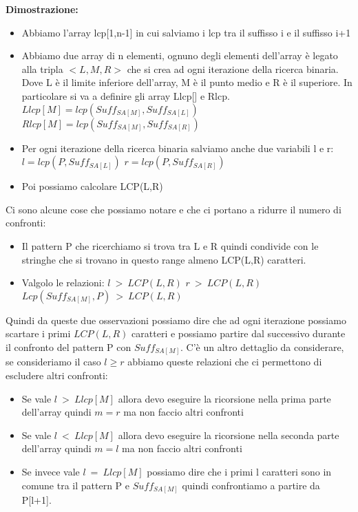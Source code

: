 \documentclass[12pt]{article}
\begin{document}
\textbf{Dimostrazione:} 
\begin{itemize}
\item Abbiamo l'array lcp[1,n-1] in cui salviamo i lcp tra il suffisso i e il suffisso i+1
\item Abbiamo due array di n elementi, ognuno degli elementi dell'array è legato alla tripla $<L,M,R>$ che si crea ad ogni iterazione della ricerca binaria. Dove L è il limite inferiore dell'array, M è il punto medio e R è il superiore. In particolare si va a definire gli array Llcp[] e Rlcp.
$Llcp[M] = lcp(Suff_{SA[M]}, Suff_{SA[L]})$
$Rlcp[M] = lcp(Suff_{SA[M]}, Suff_{SA[R]})$
\item Per ogni iterazione della ricerca binaria salviamo anche due variabili l e r:
$l = lcp(P, Suff_{SA[L]})$
$r= lcp(P, Suff_{SA[R]})$
\item Poi possiamo calcolare LCP(L,R)
\end{itemize}

Ci sono alcune cose che possiamo notare e che ci portano a ridurre il numero di confronti:

\begin{itemize}
\item Il pattern P che ricerchiamo si trova tra L e R quindi condivide con le stringhe che si trovano in questo range almeno LCP(L,R) caratteri.
\item Valgolo le relazioni:
$l\ >\ LCP(L,R)$
$r\ >\ LCP(L,R)$
$Lcp(Suff_{SA[M]},P)\ >\ LCP(L,R)$
\end{itemize} 

Quindi da queste due osservazioni possiamo dire che ad ogni iterazione possiamo scartare i primi $LCP(L,R)$ caratteri e possiamo partire dal successivo durante il confronto del pattern P con $Suff_{SA[M]}$.
C'è un altro dettaglio da considerare, se consideriamo il caso $l \geq r$ abbiamo queste relazioni che ci permettono di escludere altri confronti:

\begin{itemize}
\item Se vale $l \ >\ Llcp[M]$ allora devo eseguire la ricorsione nella prima parte dell'array quindi $m = r$ ma non faccio altri confronti
\item Se vale $l \ <\ Llcp[M]$ allora devo eseguire la ricorsione nella seconda parte dell'array quindi $m = l$ ma non faccio altri confronti
\item Se invece vale $l \ =\ Llcp[M]$ possiamo dire che i primi l caratteri sono in comune tra il pattern P e $Suff_{SA[M]}$ quindi confrontiamo a partire da P[l+1].
\end{itemize}
\end{document}
